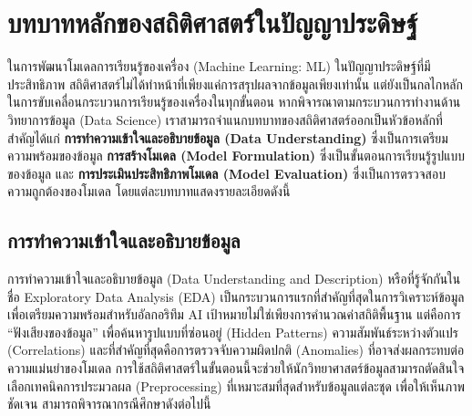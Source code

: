 \section{บทบาทหลักของสถิติศาสตร์ในปัญญาประดิษฐ์}
ในการพัฒนาโมเดลการเรียนรู้ของเครื่อง (Machine Learning: ML) ในปัญญาประดิษฐ์ที่มีประสิทธิภาพ สถิติศาสตร์ไม่ได้ทำหน้าที่เพียงแค่การสรุปผลจากข้อมูลเพียงเท่านั้น แต่ยังเป็นกลไกหลักในการขับเคลื่อนกระบวนการเรียนรู้ของเครื่องในทุกขั้นตอน หากพิจารณาตามกระบวนการทำงานด้านวิทยาการข้อมูล (Data Science) เราสามารถจำแนกบทบาทของสถิติศาสตร์ออกเป็นหัวข้อหลักที่สำคัญได้แก่ \textbf{การทำความเข้าใจและอธิบายข้อมูล (Data Understanding)} ซึ่งเป็นการเตรียมความพร้อมของข้อมูล \textbf{การสร้างโมเดล (Model Formulation)} ซึ่งเป็นขั้นตอนการเรียนรู้รูปแบบของข้อมูล และ \textbf{การประเมินประสิทธิภาพโมเดล (Model Evaluation)} ซึ่งเป็นการตรวจสอบความถูกต้องของโมเดล โดยแต่ละบทบาทแสดงรายละเอียดดังนี้

\subsection{การทำความเข้าใจและอธิบายข้อมูล}
การทำความเข้าใจและอธิบายข้อมูล (Data Understanding and Description) หรือที่รู้จักกันในชื่อ Exploratory Data Analysis (EDA) เป็นกระบวนการแรกที่สำคัญที่สุดในการวิเคราะห์ข้อมูลเพื่อเตรียมความพร้อมสำหรับอัลกอริทึม AI เป้าหมายไม่ใช่เพียงการคำนวณค่าสถิติพื้นฐาน แต่คือการ ``ฟังเสียงของข้อมูล'' เพื่อค้นหารูปแบบที่ซ่อนอยู่ (Hidden Patterns) ความสัมพันธ์ระหว่างตัวแปร (Correlations) และที่สำคัญที่สุดคือการตรวจจับความผิดปกติ (Anomalies) ที่อาจส่งผลกระทบต่อความแม่นยำของโมเดล การใช้สถิติศาสตร์ในขั้นตอนนี้จะช่วยให้นักวิทยาศาสตร์ข้อมูลสามารถตัดสินใจเลือกเทคนิคการประมวลผล (Preprocessing) ที่เหมาะสมที่สุดสำหรับข้อมูลแต่ละชุด เพื่อให้เห็นภาพชัดเจน สามารถพิจารณากรณีศึกษาดังต่อไปนี้

